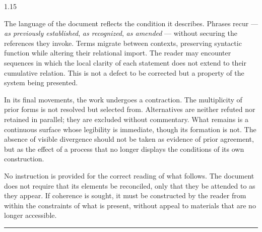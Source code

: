 \documentclass[12pt, oneside]{article}
\newcommand{\scenenumber}[1]{%
  \vspace{1em}%
  \noindent{\small\bfseries\scshape Scene #1}%
  \vspace{0.3em}\par%
}
\begin{document}
\begin{spacing}{1.15}
\medskip

The language of the document reflects the condition it describes. Phrases recur --- \textit{as previously established}, \textit{as recognized}, \textit{as amended} --- without securing the references they invoke. Terms migrate between contexts, preserving syntactic function while altering their relational import. The reader may encounter sequences in which the local clarity of each statement does not extend to their cumulative relation. This is not a defect to be corrected but a property of the system being presented.

\medskip

In its final movements, the work undergoes a contraction. The multiplicity of prior forms is not resolved but selected from. Alternatives are neither refuted nor retained in parallel; they are excluded without commentary. What remains is a continuous surface whose legibility is immediate, though its formation is not. The absence of visible divergence should not be taken as evidence of prior agreement, but as the effect of a process that no longer displays the conditions of its own construction.

\medskip

No instruction is provided for the correct reading of what follows. The document does not require that its elements be reconciled, only that they be attended to as they appear. If coherence is sought, it must be constructed by the reader from within the constraints of what is present, without appeal to materials that are no longer accessible.

\end{spacing}

\vspace{2em}

\begin{center}
  {\small\color{rulecolor}\rule{0.4\linewidth}{0.4pt}}
\end{center}

\newpage


\vspace{1.5em}

\scenenumber{1}
\end{document}
